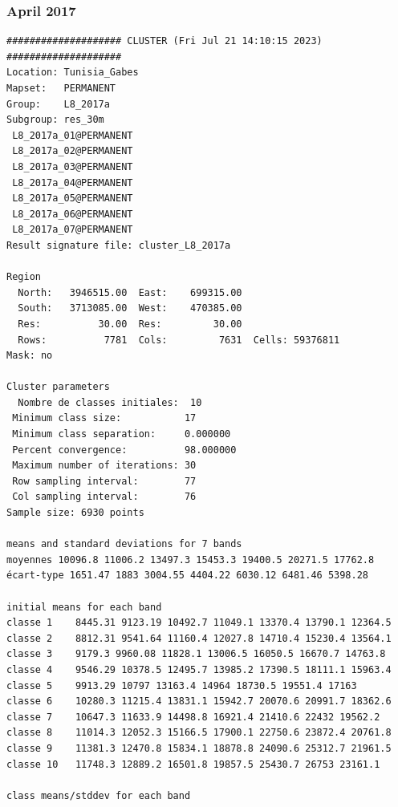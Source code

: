 \documentclass[environments,article,submit,pdftex,moreauthors]{Definitions/mdpi}
\begin{document}
\subsubsection[\appendixname~\thesubsubsection]{April 2017}
\begin{scriptsize}
\begin{verbatim}
#################### CLUSTER (Fri Jul 21 14:10:15 2023) ####################
Location: Tunisia_Gabes
Mapset:   PERMANENT
Group:    L8_2017a
Subgroup: res_30m
 L8_2017a_01@PERMANENT
 L8_2017a_02@PERMANENT
 L8_2017a_03@PERMANENT
 L8_2017a_04@PERMANENT
 L8_2017a_05@PERMANENT
 L8_2017a_06@PERMANENT
 L8_2017a_07@PERMANENT
Result signature file: cluster_L8_2017a

Region
  North:   3946515.00  East:    699315.00
  South:   3713085.00  West:    470385.00
  Res:          30.00  Res:         30.00
  Rows:          7781  Cols:         7631  Cells: 59376811
Mask: no

Cluster parameters
  Nombre de classes initiales: 	10
 Minimum class size:           17
 Minimum class separation:     0.000000
 Percent convergence:          98.000000
 Maximum number of iterations: 30
 Row sampling interval:        77
 Col sampling interval:        76
Sample size: 6930 points

means and standard deviations for 7 bands
moyennes 10096.8 11006.2 13497.3 15453.3 19400.5 20271.5 17762.8
écart-type 1651.47 1883 3004.55 4404.22 6030.12 6481.46 5398.28

initial means for each band
classe 1    8445.31 9123.19 10492.7 11049.1 13370.4 13790.1 12364.5
classe 2    8812.31 9541.64 11160.4 12027.8 14710.4 15230.4 13564.1
classe 3    9179.3 9960.08 11828.1 13006.5 16050.5 16670.7 14763.8
classe 4    9546.29 10378.5 12495.7 13985.2 17390.5 18111.1 15963.4
classe 5    9913.29 10797 13163.4 14964 18730.5 19551.4 17163
classe 6    10280.3 11215.4 13831.1 15942.7 20070.6 20991.7 18362.6
classe 7    10647.3 11633.9 14498.8 16921.4 21410.6 22432 19562.2
classe 8    11014.3 12052.3 15166.5 17900.1 22750.6 23872.4 20761.8
classe 9    11381.3 12470.8 15834.1 18878.8 24090.6 25312.7 21961.5
classe 10   11748.3 12889.2 16501.8 19857.5 25430.7 26753 23161.1

class means/stddev for each band


\end{verbatim}
\end{scriptsize}
\end{document}
